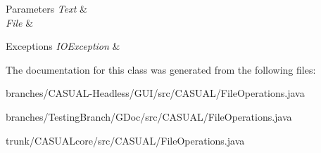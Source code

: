 \begin{DoxyParams}{Parameters}
{\em Text} & \\
\hline
{\em File} & \\
\hline
\end{DoxyParams}

\begin{DoxyExceptions}{Exceptions}
{\em I\-O\-Exception} & \\
\hline
\end{DoxyExceptions}


The documentation for this class was generated from the following files\-:\begin{DoxyCompactItemize}
\item 
branches/\-C\-A\-S\-U\-A\-L-\/\-Headless/\-G\-U\-I/src/\-C\-A\-S\-U\-A\-L/File\-Operations.\-java\item 
branches/\-Testing\-Branch/\-G\-Doc/src/\-C\-A\-S\-U\-A\-L/File\-Operations.\-java\item 
trunk/\-C\-A\-S\-U\-A\-Lcore/src/\-C\-A\-S\-U\-A\-L/File\-Operations.\-java\end{DoxyCompactItemize}
